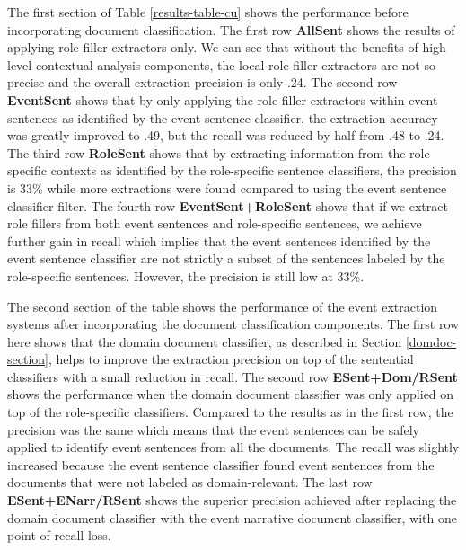 The first section of Table \ref{results-table-cu} shows the performance 
before incorporating document classification.
The first row {\bf AllSent} shows the results of applying role filler extractors only. 
We can see that without the benefits of high level contextual analysis components, 
the local role filler extractors are not so precise and the overall extraction precision 
is only .24. The second row {\bf EventSent} shows that by only applying the role filler extractors 
within event sentences as identified by the event sentence classifier, the extraction accuracy 
was greatly improved to .49, but the recall was reduced by half from .48 to .24.
The third row {\bf RoleSent} shows that by 
extracting information from the role specific contexts as identified by the role-specific sentence classifiers, 
the precision 
is 33\%
while more extractions were found compared to 
using the event sentence classifier filter. 
The fourth row {\bf EventSent+RoleSent} shows that if we extract role fillers from both event sentences and 
role-specific sentences, we achieve further gain in recall which implies that 
the event sentences identified by the event sentence classifier are not strictly 
a subset of the sentences labeled by the role-specific sentences. However, the precision is 
still low at 33\%. 

The second section of the table shows the performance of the event extraction systems 
after incorporating the document classification components. 
The first row 
here shows that the domain document classifier, as described in Section \ref{domdoc-section}, 
helps to improve the extraction 
precision on top of the sentential classifiers with a small reduction in recall.
The second row {\bf ESent+Dom/RSent} shows the performance when the domain document classifier was only applied 
on top of the role-specific classifiers. 
Compared to the results as in the first row, the precision was the same which means that 
the event sentences can be safely applied to identify event sentences from all the documents.
The recall was slightly increased 
because the event sentence classifier found event sentences from the documents that 
were not labeled as domain-relevant.
The last row {\bf ESent+ENarr/RSent} shows the superior precision achieved after replacing the domain document classifier 
with the event narrative document classifier, with one point of recall loss.


